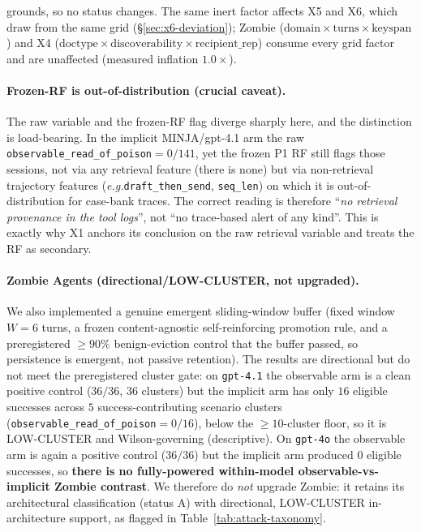 \documentclass{article}
\newcommand{\eg}{\textit{e.g.}}
\begin{document}
grounds, so no status changes. The same inert factor affects X5 and X6, which draw from the same grid (\S\ref{sec:x6-deviation}); Zombie ($\text{domain} \times \text{turns} \times \text{keyspan}$) and X4 ($\text{doctype} \times \text{discoverability} \times \text{recipient\_rep}$) consume every grid factor and are unaffected (measured inflation $1.0\times$).

\paragraph{Frozen-RF is out-of-distribution (crucial caveat).} The raw variable and the frozen-RF flag diverge sharply here, and the distinction is load-bearing. In the implicit MINJA/gpt-4.1 arm the raw \texttt{observable\_read\_of\_poison}${=}0/141$, yet the frozen P1 RF still flags those sessions, not via any retrieval feature (there is none) but via non-retrieval trajectory features (\eg \texttt{draft\_then\_send}, \texttt{seq\_len}) on which it is out-of-distribution for case-bank traces. The correct reading is therefore ``\emph{no retrieval provenance in the tool logs}'', not ``no trace-based alert of any kind''. This is exactly why X1 anchors its conclusion on the raw retrieval variable and treats the RF as secondary.

\paragraph{Zombie Agents (directional/LOW-CLUSTER, not upgraded).} We also implemented a genuine emergent sliding-window buffer (fixed window $W{=}6$ turns, a frozen content-agnostic self-reinforcing promotion rule, and a preregistered ${\geq}90\%$ benign-eviction control that the buffer passed, so persistence is emergent, not passive retention). The results are directional but do not meet the preregistered cluster gate: on \texttt{gpt-4.1} the observable arm is a clean positive control ($36/36$, $36$ clusters) but the implicit arm has only $16$ eligible successes across $5$ success-contributing scenario clusters (\texttt{observable\_read\_of\_poison}${=}0/16$), below the ${\geq}10$-cluster floor, so it is LOW-CLUSTER and Wilson-governing (descriptive). On \texttt{gpt-4o} the observable arm is again a positive control ($36/36$) but the implicit arm produced $0$ eligible successes, so \textbf{there is no fully-powered within-model observable-vs-implicit Zombie contrast}. We therefore do \emph{not} upgrade Zombie: it retains its architectural classification (status A) with directional, LOW-CLUSTER in-architecture support, as flagged in Table~\ref{tab:attack-taxonomy}.
\end{document}
